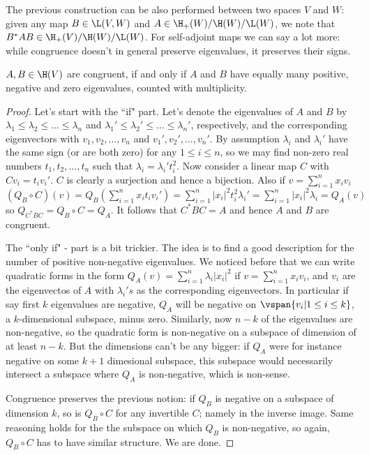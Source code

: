 The previous construction can be also performed between two spaces $V$ and $W$: given any map $B \in \L(V, W)$ and $A \in \H_{+}(W)/\H(W)/\L(W)$, we note that $B^{*}AB \in \H_{+}(V)/\H(W)/\L(W)$. For self-adjoint maps we can say a lot more: while congruence doesn't in general preserve eigenvalues, it preserves their signs.

\begin{lause}
	$A, B \in \H(V)$ are congruent, if and only if $A$ and $B$ have equally many positive, negative and zero eigenvalues, counted with multiplicity.
\end{lause}
\begin{proof}
	Let's start with the ``if" part. Let's denote the eigenvalues of $A$ and $B$ by $\lambda_{1} \leq \lambda _{2} \leq \ldots \leq \lambda_{n}$ and $\lambda_{1}' \leq \lambda _{2}' \leq \ldots \leq \lambda_{n}'$, respectively, and the corresponding eigenvectors with $v_{1}, v_{2}, \ldots, v_{n}$ and $v_{1}', v_{2}', \ldots, v_{n}'$. By assumption $\lambda_{i}$ and $\lambda_{i}'$ have the same sign (or are both zero) for any $1 \leq i \leq n$, so we may find non-zero real numbers $t_{1}, t_{2}, \ldots, t_{n}$ such that $\lambda_{i} = \lambda_{i}' t_{i}^{2}$. Now consider a linear map $C$ with $C v_{i} = t_{i} v_{i}'$. $C$ is clearly a surjection and hence a bijection. Also if $v = \sum_{i = 1}^{n} x_{i} v_{i}$ $(Q_{B} \circ C)(v) = Q_{B}(\sum_{i = 1}^{n} x_{i} t_{i} v_{i}') = \sum_{i = 1}^{n} |x_{i}|^{2} t_{i}^2 \lambda_{i}' = \sum_{i = 1}^{n} |x_{i}|^{2} \lambda_{i} = Q_{A}(v)$ so $Q_{C^{*}BC} = Q_{B} \circ C = Q_{A}$. It follows that $C^{*}BC = A$ and hence $A$ and $B$ are congruent.

	The ``only if" - part is a bit trickier. The idea is to find a good description for the number of positive non-negative eigenvalues. We noticed before that we can write quadratic forms in the form $Q_{A}(v) = \sum_{i = 1}^{n} \lambda_{i} |x_{i}|^{2}$ if $v = \sum_{i = 1}^{n} x_{i}v_{i}$, and $v_{i}$ are the eigenvectos of $A$ with $\lambda_{i}'s$ as the corresponding eigenvectors. In particular if say first $k$ eigenvalues are negative, $Q_{A}$ will be negative on $\vspan\{v_{i} | 1 \leq i \leq k\}$, a $k$-dimensional subspace, minus zero. Similarly, now $n - k$ of the eigenvalues are non-negative, so the quadratic form is non-negative on a subspace of dimension of at least $n - k$. But the dimensions can't be any bigger: if $Q_{A}$ were for instance negative on some $k + 1$ dimesional subspace, this subspace would necessarily intersect a subspace where $Q_{A}$ is non-negative, which is non-sense.

	Congruence preserves the previous notion: if $Q_{B}$ is negative on a subspace of dimension $k$, so is $Q_{B} \circ C$ for any invertible $C$; namely in the inverse image. Same reasoning holds for the the subspace on which $Q_{B}$ is non-negative, so again, $Q_{B} \circ C$ has to have similar structure. We are done.
\end{proof}

